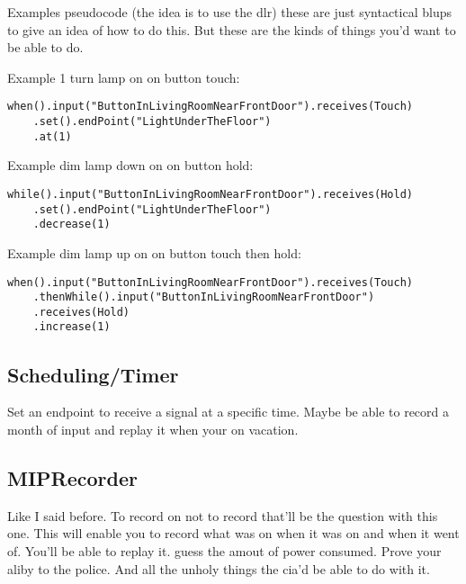 \documentclass[a4paper]{article}
\begin{document}
Examples pseudocode (the idea is to use the dlr) these are just syntactical blups to give an idea of how to do this. But these are the kinds of things you'd want to be able to do.

Example 1 turn lamp on on button touch:
\begin{verbatim}
when().input("ButtonInLivingRoomNearFrontDoor").receives(Touch)
	.set().endPoint("LightUnderTheFloor")
	.at(1)
\end{verbatim}

Example dim lamp down on on button hold:
\begin{verbatim}
while().input("ButtonInLivingRoomNearFrontDoor").receives(Hold)
	.set().endPoint("LightUnderTheFloor")
	.decrease(1)
\end{verbatim}

Example dim lamp up on on button touch then hold:
\begin{verbatim}
when().input("ButtonInLivingRoomNearFrontDoor").receives(Touch)
	.thenWhile().input("ButtonInLivingRoomNearFrontDoor")
	.receives(Hold)
	.increase(1)
\end{verbatim}
 
\subsection{Scheduling/Timer}
Set an endpoint to receive a signal at a specific time. Maybe be able to record a month of input and replay it when your on vacation.

\subsection{MIPRecorder}
Like I said before. To record on not to record that'll be the question with this one. This will enable you to record what was on when it was on and when it went of. You'll be able to replay it. guess the amout of power consumed. Prove your aliby to the police. And all the unholy things the cia'd be able to do with it.
\end{document}
